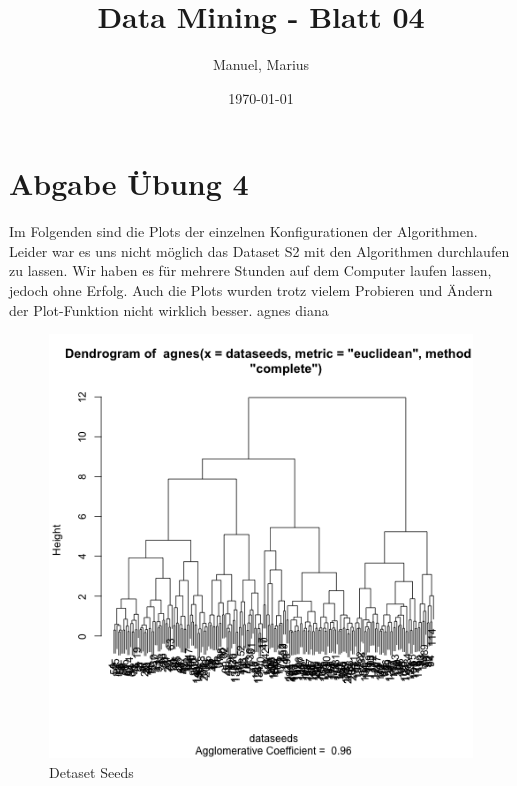 \documentclass{article}
\title{Data Mining - Blatt 04}
\author{Manuel, Marius}
\date{\today}
\begin{document}
\maketitle

\section{Abgabe Übung 4}
Im Folgenden sind die Plots der einzelnen Konfigurationen der Algorithmen. Leider war es uns nicht möglich das Dataset S2 mit den Algorithmen durchlaufen zu lassen. Wir haben es für mehrere Stunden auf dem Computer laufen lassen, jedoch ohne Erfolg. Auch die Plots wurden trotz vielem Probieren und Ändern der Plot-Funktion nicht wirklich besser.
agnes diana

\begin{figure}[ht!]
\caption{Detaset Seeds}
\centering
\includegraphics[width=1\textwidth]{plots/ang1dataseeds.png}
\end{figure}
\end{document}
